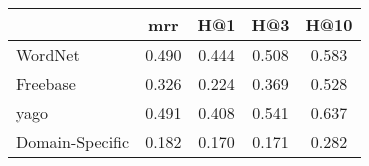 \begin{tabular}{@{}lSSSS@{}}
  \toprule
                  & {\ac{mrr}} & {H@1} & {H@3} & {H@10} \\
  \midrule
  WordNet         & 0.490      & 0.444 & 0.508 & 0.583  \\
  Freebase        & 0.326      & 0.224 & 0.369 & 0.528  \\
  \ac{yago}       & 0.491      & 0.408 & 0.541 & 0.637  \\
  Domain-Specific & 0.182      & 0.170 & 0.171 & 0.282  \\
  \bottomrule
\end{tabular}
